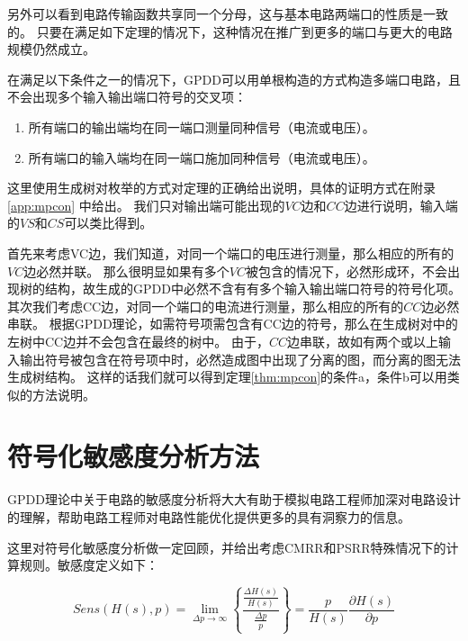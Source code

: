另外可以看到电路传输函数共享同一个分母，这与基本电路两端口的性质是一致的。
只要在满足如下定理的情况下，这种情况在推广到更多的端口与更大的电路规模仍然成立。

\begin{thm}\label{thm:mpcon}
	在满足以下条件之一的情况下，GPDD可以用单根构造的方式构造多端口电路，且不会出现多个输入输出端口符号的交叉项：
	\begin{enumerate}[label=\emph{\alph*})]
		\item 所有端口的输出端均在同一端口测量同种信号（电流或电压）。
		\item 所有端口的输入端均在同一端口施加同种信号（电流或电压）。
	\end{enumerate}
\end{thm}

这里使用生成树对枚举的方式对定理的正确给出说明，具体的证明方式在附录\ref{app:mpcon} 中给出。
我们只对输出端可能出现的$VC$边和$CC$边进行说明，输入端的$VS$和$CS$可以类比得到。

首先来考虑VC边，我们知道，对同一个端口的电压进行测量，那么相应的所有的$VC$边必然并联。
那么很明显如果有多个$VC$被包含的情况下，必然形成环，不会出现树的结构，故生成的GPDD中必然不含有有多个输入输出端口符号的符号化项。
其次我们考虑CC边，对同一个端口的电流进行测量，那么相应的所有的$CC$边必然串联。
根据GPDD理论\parencite{GShi-GPDD}，如需符号项需包含有CC边的符号，那么在生成树对中的左树中CC边并不会包含在最终的树中。
由于，$CC$边串联，故如有两个或以上输入输出符号被包含在符号项中时，必然造成图中出现了分离的图，而分离的图无法生成树结构。
这样的话我们就可以得到定理\ref{thm:mpcon}的条件a，条件b可以用类似的方法说明。

\section{符号化敏感度分析方法}

GPDD理论中关于电路的敏感度分析将大大有助于模拟电路工程师加深对电路设计的理解，帮助电路工程师对电路性能优化提供更多的具有洞察力的信息\parencite{MengXiaoxuan-Sens-2009,WengBinbin-Sens-2011,ChenJiajun-Sens-2012}。

这里对符号化敏感度分析做一定回顾，并给出考虑CMRR和PSRR特殊情况下的计算规则。敏感度定义如下：

\begin{equation}
Sens\left( {H\left( s \right),p} \right) = \mathop {\lim }\limits_{\Delta p \to \infty } \left\{ {\frac{{\frac{{\Delta H\left( s \right)}}{{H\left( s \right)}}}}{{\frac{{\Delta p}}{p}}}} \right\} = \frac{p}{{H\left( s \right)}}\frac{{\partial H\left( s \right)}}{{\partial p}}
\end{equation}

